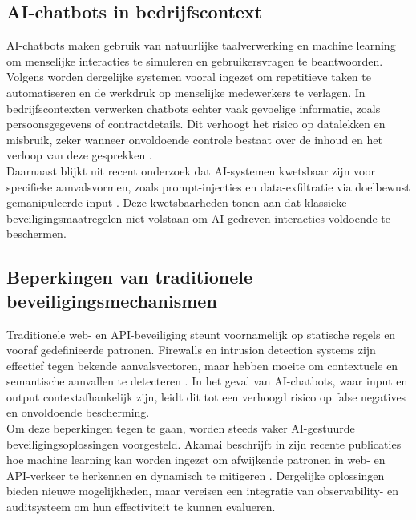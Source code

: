 \subsection{AI-chatbots in bedrijfscontext}

\noindent AI-chatbots maken gebruik van natuurlijke taalverwerking en machine learning om menselijke interacties te simuleren en gebruikersvragen te beantwoorden. Volgens \textcite{Adamopoulou2020} worden dergelijke systemen vooral ingezet om repetitieve taken te automatiseren en de werkdruk op menselijke medewerkers te verlagen. In bedrijfscontexten verwerken chatbots echter vaak gevoelige informatie, zoals persoonsgegevens of contractdetails. Dit verhoogt het risico op datalekken en misbruik, zeker wanneer onvoldoende controle bestaat over de inhoud en het verloop van deze gesprekken \autocite{Bender2021}.\\

\noindent Daarnaast blijkt uit recent onderzoek dat AI-systemen kwetsbaar zijn voor specifieke aanvalsvormen, zoals prompt-injecties en data-exfiltratie via doelbewust gemanipuleerde input \autocite{Greshake2023}. Deze kwetsbaarheden tonen aan dat klassieke beveiligingsmaatregelen niet volstaan om AI-gedreven interacties voldoende te beschermen.

\subsection{Beperkingen van traditionele beveiligingsmechanismen}

\noindent Traditionele web- en API-beveiliging steunt voornamelijk op statische regels en vooraf gedefinieerde patronen. Firewalls en intrusion detection systems zijn effectief tegen bekende aanvalsvectoren, maar hebben moeite om contextuele en semantische aanvallen te detecteren \autocite{Sommer2010}. In het geval van AI-chatbots, waar input en output contextafhankelijk zijn, leidt dit tot een verhoogd risico op false negatives en onvoldoende bescherming.\\

\noindent Om deze beperkingen tegen te gaan, worden steeds vaker AI-gestuurde beveiligingsoplossingen voorgesteld. Akamai beschrijft in zijn recente publicaties hoe machine learning kan worden ingezet om afwijkende patronen in web- en API-verkeer te herkennen en dynamisch te mitigeren \autocite{AkamaiFirewallAI2025}. Dergelijke oplossingen bieden nieuwe mogelijkheden, maar vereisen een integratie van observability- en auditsysteem om hun effectiviteit te kunnen evalueren.


